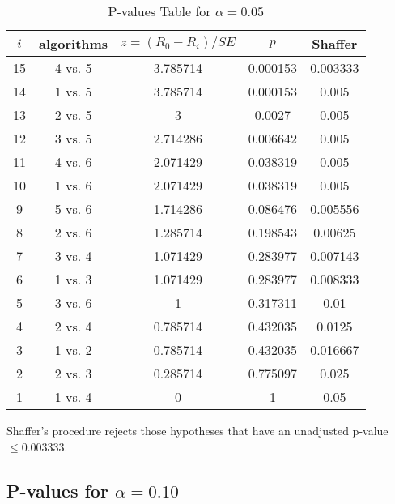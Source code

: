 \documentclass[a4paper,10pt]{article}
\begin{document}
\begin{landscape}
\begin{table}[!htp]
\centering\scriptsize
\begin{tabular}{ccccc}
$i$&algorithms&$z=(R_0 - R_i)/SE$&$p$&Shaffer\\
\hline15&4 vs. 5&3.785714&0.000153&0.003333\\
14&1 vs. 5&3.785714&0.000153&0.005\\
13&2 vs. 5&3&0.0027&0.005\\
12&3 vs. 5&2.714286&0.006642&0.005\\
11&4 vs. 6&2.071429&0.038319&0.005\\
10&1 vs. 6&2.071429&0.038319&0.005\\
9&5 vs. 6&1.714286&0.086476&0.005556\\
8&2 vs. 6&1.285714&0.198543&0.00625\\
7&3 vs. 4&1.071429&0.283977&0.007143\\
6&1 vs. 3&1.071429&0.283977&0.008333\\
5&3 vs. 6&1&0.317311&0.01\\
4&2 vs. 4&0.785714&0.432035&0.0125\\
3&1 vs. 2&0.785714&0.432035&0.016667\\
2&2 vs. 3&0.285714&0.775097&0.025\\
1&1 vs. 4&0&1&0.05\\
\hline
\end{tabular}
\caption{P-values Table for $\alpha=0.05$}
\end{table}Shaffer's procedure rejects those hypotheses that have an unadjusted p-value $\le0.003333$.

\pagebreak

\subsection{P-values for $\alpha=0.10$}


\end{landscape}
\end{document}
